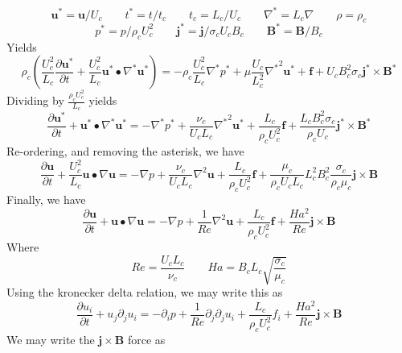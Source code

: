 \documentclass[11pt]{article}
\begin{document}
\begin{equation}
\pmb{u}^* = \pmb{u}/U_c \qquad
t^* = t/t_c \qquad
t_c = L_c/U_c \qquad
\nabla^* = L_c \nabla \qquad
\rho = \rho_c
\end{equation}
\begin{equation}
p^* = p/\rho_c U_c^2 \qquad
\pmb{j}^* = \pmb{j}/ \sigma_c U_c B_c \qquad
\pmb{B}^* = \pmb{B}/B_c
\end{equation}
Yields
\begin{equation}
\rho_c \left( \frac{U_c^2}{L_c} \frac{\partial \pmb{u^*}}{\partial t} + \frac{U_c^2}{L_c} \pmb{u^*} \bullet \nabla^* \pmb{u^*} \right) = 
- \rho_c \frac{U_c^2}{L_c} \nabla^*  p^* + \mu \frac{U_c}{L_c^2} {\nabla^*}^2 \pmb{u^*} + \pmb{f} +
U_c B_c^2 \sigma_c \pmb{j^*} \times \pmb{B^*}
\end{equation}
Dividing by $\frac{\rho_c U_c^2}{L_c}$ yields
\begin{equation}
\frac{\partial \pmb{u^*}}{\partial t} + \pmb{u^*} \bullet \nabla^* \pmb{u^*} = 
- \nabla^*  p^* + 
\frac{\nu_c}{U_c L_c} {\nabla^*}^2 \pmb{u^*} + \frac{L_c}{\rho_c U_c^2} \pmb{f} + 
\frac{L_c B_c^2 \sigma_c}{\rho_c U_c} \pmb{j^*} \times \pmb{B^*}
\end{equation}
Re-ordering, and removing the asterisk, we have
\begin{equation}
\frac{\partial \pmb{u}}{\partial t} + \frac{U_c^2}{L_c} \pmb{u} \bullet \nabla \pmb{u} = 
- \nabla  p + 
\frac{\nu_c}{U_c L_c} {\nabla}^2 \pmb{u} + \frac{L_c}{\rho_c U_c^2} \pmb{f} + 
\frac{\mu_c}{\rho_c U_c L_c} 
L_c^2 B_c^2 \frac{\sigma_c}{\rho_c \mu_c}
\pmb{j} \times \pmb{B}
\end{equation}
Finally, we have
\begin{equation}
\frac{\partial \pmb{u}}{\partial t} + \pmb{u} \bullet \nabla \pmb{u} = 
-\nabla  p + 
\frac{1}{Re} {\nabla}^2 \pmb{u} + \frac{L_c}{\rho_c U_c^2} \pmb{f} + 
\frac{Ha^2}{Re} \pmb{j} \times \pmb{B}
\end{equation}
Where
\begin{equation}
Re = \frac{U_c L_c}{\nu_c} \qquad
Ha = B_c L_c \sqrt{\frac{\sigma_c}{\mu_c}} \end{equation}
Using the kronecker delta relation, we may write this as
\begin{equation}
\frac{\partial u_i }{\partial t} + u_j \partial_j u_i = 
-\partial_i  p + 
\frac{1}{Re} \partial_j \partial_j u_i + 
\frac{L_c}{\rho_c U_c^2} f_i +
\frac{Ha^2}{Re} \pmb{j} \times \pmb{B}
\end{equation}
We may write the $\pmb{j}\times \pmb{B}$ force as
\end{document}

